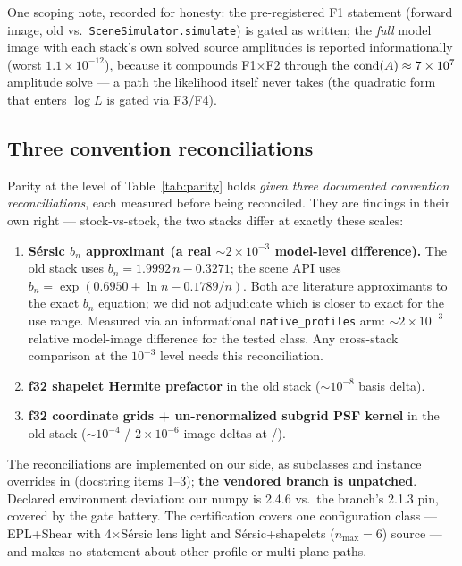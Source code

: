 One scoping note, recorded for honesty: the pre-registered F1 statement
(forward image, old vs.\ \texttt{SceneSimulator.simulate}) is gated as
written; the \emph{full} model image with each stack's own solved source
amplitudes is reported informationally (worst $1.1\times10^{-12}$), because
it compounds F1$\times$F2 through the ${\rm cond}(A)\approx7\times10^{7}$
amplitude solve --- a path the likelihood itself never takes (the quadratic
form that enters $\log L$ is gated via F3/F4).

\subsection{Three convention reconciliations}
\label{sec:conventions}

Parity at the level of Table~\ref{tab:parity} holds \emph{given three
documented convention reconciliations}, each measured before being
reconciled. They are findings in their own right --- stock-vs-stock, the two
stacks differ at exactly these scales:

\begin{enumerate}
\item \textbf{S\'ersic $b_n$ approximant (a real
$\sim$$2\times10^{-3}$ model-level difference).} The old stack uses
$b_n = 1.9992\,n - 0.3271$; the scene API uses
$b_n = \exp(0.6950 + \ln n - 0.1789/n)$. Both are literature approximants to
the exact $b_n$ equation; we did not adjudicate which is closer to exact for
the use range. Measured via an informational \texttt{native\_profiles} arm:
$\sim$$2\times10^{-3}$ relative model-image
difference for the tested class. Any cross-stack comparison at the $10^{-3}$ level
needs this reconciliation.
\item \textbf{f32 shapelet Hermite prefactor} in the old stack
($\sim$$10^{-8}$ basis delta).
\item \textbf{f32 coordinate grids + un-renormalized subgrid PSF kernel} in
the old stack ($\sim$$10^{-4}$ / $2\times10^{-6}$ image deltas at
/).
\end{enumerate}

The reconciliations are implemented on our side, as subclasses and instance
overrides in  (docstring items 1--3);
\textbf{the vendored branch is unpatched}. Declared environment deviation: our numpy is
2.4.6 vs.\ the branch's 2.1.3 pin, covered by the gate battery. The
certification covers one configuration class --- EPL+Shear with
4$\times$S\'ersic lens light and S\'ersic+shapelets ($n_{\max}=6$) source ---
and makes no statement about other profile or multi-plane paths.

